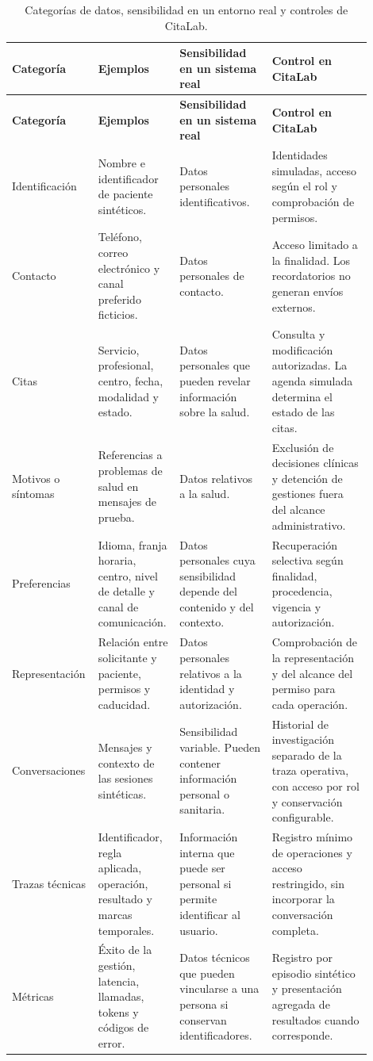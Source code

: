 \small
\setlength{\tabcolsep}{3pt}
\begin{longtable}{L{0.18\linewidth}L{0.20\linewidth}L{0.25\linewidth}L{0.27\linewidth}}
\caption{Categorías de datos, sensibilidad en un entorno real y controles de CitaLab.}\label{tab:datos-sensibilidad}\\
\toprule
\textbf{Categoría} & \textbf{Ejemplos} & \textbf{Sensibilidad en un sistema real} & \textbf{Control en CitaLab} \\
\midrule
\endfirsthead
\toprule
\textbf{Categoría} & \textbf{Ejemplos} & \textbf{Sensibilidad en un sistema real} & \textbf{Control en CitaLab} \\
\midrule
\endhead
Identificación & Nombre e identificador de paciente sintéticos. & Datos personales identificativos. & Identidades simuladas, acceso según el rol y comprobación de permisos. \\
Contacto & Teléfono, correo electrónico y canal preferido ficticios. & Datos personales de contacto. & Acceso limitado a la finalidad. Los recordatorios no generan envíos externos. \\
Citas & Servicio, profesional, centro, fecha, modalidad y estado. & Datos personales que pueden revelar información sobre la salud. & Consulta y modificación autorizadas. La agenda simulada determina el estado de las citas. \\
Motivos o síntomas & Referencias a problemas de salud en mensajes de prueba. & Datos relativos a la salud. & Exclusión de decisiones clínicas y detención de gestiones fuera del alcance administrativo. \\
Preferencias & Idioma, franja horaria, centro, nivel de detalle y canal de comunicación. & Datos personales cuya sensibilidad depende del contenido y del contexto. & Recuperación selectiva según finalidad, procedencia, vigencia y autorización. \\
Representación & Relación entre solicitante y paciente, permisos y caducidad. & Datos personales relativos a la identidad y autorización. & Comprobación de la representación y del alcance del permiso para cada operación. \\
Conversaciones & Mensajes y contexto de las sesiones sintéticas. & Sensibilidad variable. Pueden contener información personal o sanitaria. & Historial de investigación separado de la traza operativa, con acceso por rol y conservación configurable. \\
Trazas técnicas & Identificador, regla aplicada, operación, resultado y marcas temporales. & Información interna que puede ser personal si permite identificar al usuario. & Registro mínimo de operaciones y acceso restringido, sin incorporar la conversación completa. \\
Métricas & Éxito de la gestión, latencia, llamadas, tokens y códigos de error. & Datos técnicos que pueden vincularse a una persona si conservan identificadores. & Registro por episodio sintético y presentación agregada de resultados cuando corresponde. \\
\bottomrule
\end{longtable}
\normalsize
\setlength{\tabcolsep}{6pt}

